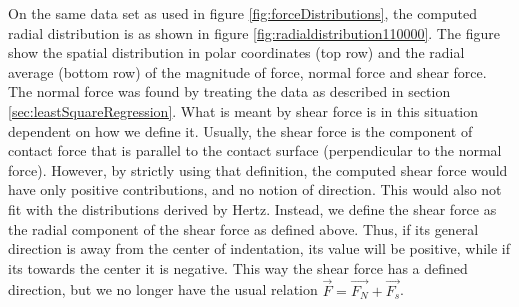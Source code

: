 \documentclass[twoside,english]{uiofysmaster}
\begin{document}
\noindent
On the same data set as used in figure \ref{fig:forceDistributions}, the computed radial distribution is as shown in figure \ref{fig:radialdistribution110000}.
The figure show the spatial distribution in polar coordinates (top row) and the radial average (bottom row) of the magnitude of force, normal force and shear force.
The normal force was found by treating the data as described in section \ref{sec:leastSquareRegression}.
What is meant by shear force is in this situation dependent on how we define it. 
Usually, the shear force is the component of contact force that is parallel to the contact surface (perpendicular to the normal force). 
However, by strictly using that definition, the computed shear force would have only positive contributions, and no notion of direction.
This would also not fit with the distributions derived by Hertz. 
Instead, we define the shear force as the radial component of the shear force as defined above.
Thus, if its general direction is away from the center of indentation, its value will  be positive, while if its towards the center it is negative. 
This way the shear force has a defined direction, but we no longer have the usual relation $\vec{F}=\vec{F_N} + \vec{F_s}$.
\end{document}
